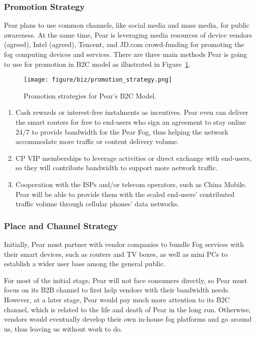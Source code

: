 \subsubsection{Promotion Strategy}
Pear plans to use common channels, like social media and mass media, for public awareness.
At the same time, Pear is leveraging media resources of device vendors (agreed), Intel (agreed), Tencent, and JD.com crowd-funding for promoting the fog computing devices and services. There are three main methods Pear is going to use for promotion in B2C model as illustrated in Figure~\ref{fig:promotion-strategy}.  
\begin{figure}[ht]
	\centering
	\texttt{[image: figure/biz/promotion\_strategy.png]}
	\caption{Promotion strategies for Pear's B2C Model.} \label{fig:promotion-strategy}
\end{figure}
\begin{enumerate}
	\item Cash rewards or interest-free instalments as incentives. Pear even can deliver the smart routers for free to end-users who sign an agreement to stay online 24/7 to provide bandwidth for the Pear Fog, thus helping the network accommodate more traffic or content delivery volume.
	\item CP VIP memberships to leverage activities or direct exchange with end-users, so they will contribute bandwidth to support more network traffic.
	\item Cooperation with the ISPs and/or telecom operators, such as China Mobile. Pear will be able to provide them with the scaled end-users' contributed traffic volume through cellular phones' data networks.
\end{enumerate}

\subsubsection{Place and Channel Strategy}
Initially, Pear must partner with vendor companies to bundle Fog services with their smart devices, such as routers and TV boxes, as well as mini PCs to establish a wider user base among the general public.

For most of the initial stage, Pear will not face consumers directly, so Pear must focus on its B2B channel to first help vendors with their bandwidth needs. However, at a later stage, Pear would pay much more attention to its B2C channel, which is related to the life and death of Pear in the long run. Otherwise, vendors would eventually develop their own in-house fog platforms and go around us, thus leaving us without work to do. 

